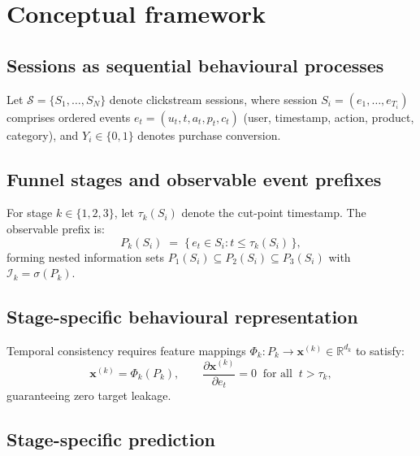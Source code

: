 \documentclass[a4paper]{article}
\begin{document}
\section{Conceptual framework}
\label{sec:framework}

\subsection{Sessions as sequential behavioural processes}
\label{sec:framework-sessions}

Let $\mathcal{S} = \{S_1, \dots, S_N\}$ denote clickstream sessions, where
session $S_i = (e_1, \dots, e_{T_i})$ comprises ordered events $e_t = (u_t, t, a_t,
p_t, c_t)$ (user, timestamp, action, product, category), and $Y_i \in \{0, 1\}$
denotes purchase conversion.

\subsection{Funnel stages and observable event prefixes}
\label{sec:framework-prefixes}

For stage $k \in \{1, 2, 3\}$, let $\tau_k(S_i)$ denote the cut-point timestamp.
The observable prefix is:
\begin{equation}
P_k(S_i) \;=\; \{\, e_t \in S_i : t \le \tau_k(S_i) \,\},
\label{eq:prefix}
\end{equation}
forming nested information sets $P_1(S_i) \subseteq P_2(S_i) \subseteq P_3(S_i)$
with $\mathcal{I}_k = \sigma(P_k)$.

\subsection{Stage-specific behavioural representation}
\label{sec:framework-features}

Temporal consistency requires feature mappings $\Phi_k : P_k \to \mathbf{x}^{(k)}
\in \mathbb{R}^{d_k}$ to satisfy:
\begin{equation}
\mathbf{x}^{(k)} = \Phi_k\!\left(P_k\right),
\qquad
\frac{\partial \mathbf{x}^{(k)}}{\partial e_t} = 0
\;\;\text{for all}\;\; t > \tau_k,
\label{eq:temporal-consistency}
\end{equation}
guaranteeing zero target leakage.

\subsection{Stage-specific prediction}
\label{sec:framework-prediction}
\end{document}
